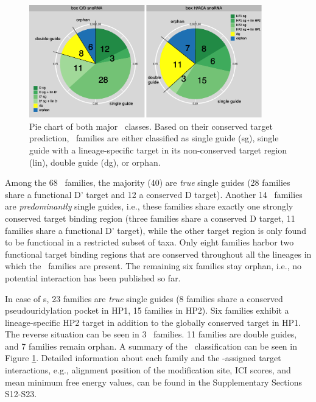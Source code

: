 \begin{figure}
  \centering
  \includegraphics[width=0.9\textwidth]{pics/pieCharts_snoRNAs_modified.eps}
  \caption[Classification of \sno\ families as single or double
  guides.]{Pie chart of both major \sno\ classes. Based on their
    conserved target prediction, \sno\ families are either classified
    as single guide (sg), single guide with a lineage-specific target
    in its non-conserved target region (lin), double guide (dg), or
    orphan.}
  \label{fig:pie_charts}
\end{figure}

Among the 68 \cd\ families, the majority (40) are \textit{true} single
guides  (28 families share a functional D' target
and 12 a conserved D target). Another 14 \cd\ families are
\textit{predominantly} single guides, i.e., these families share
exactly one strongly conserved target binding region (three families
share a conserved D target, 11 families share a functional D'
target), while the other target region is only found to be functional
in a restricted subset of taxa. Only eight families harbor two
functional target binding regions that are conserved throughout all
the lineages in which the \sno\ families are present. The remaining
six families stay orphan, i.e., no potential interaction has been
published so far.

In case of {\haca}s, 23 families are \textit{true} single guides (8
families share a conserved pseudouridylation pocket in HP1, 15
families in HP2). Six families exhibit a lineage-specific HP2 target
in addition to the globally conserved target in HP1. The reverse situation
can be seen in 3 \haca\ families. 11 families are double guides, and 7
families remain orphan. A summary of the \sno\ classification can be seen in
Figure \ref{fig:pie_charts}.  Detailed information about each family and
the \snostrip-assigned target interactions, e.g., alignment position of the
modification site, ICI scores, and mean minimum free energy values, can be
found in the Supplementary Sections S12-S23.

